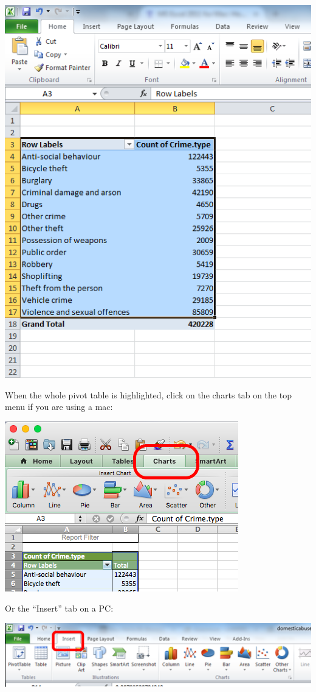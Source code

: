 \documentclass[
]{book}
\begin{document}
\includegraphics{imgs/crime_type_table.png}

When the whole pivot table is highlighted, click on the charts tab on the top menu if you are using a mac:

\includegraphics{imgs/click_charts_tab.png}

Or the ``Insert'' tab on a PC:

\includegraphics{imgs/on_pc_insert.png}
\end{document}
